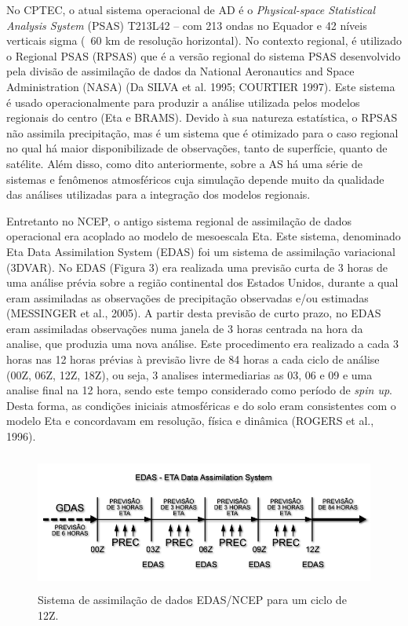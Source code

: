 No CPTEC, o atual sistema operacional de AD é o \textit{Physical-space Statistical Analysis System} (PSAS) T213L42 – com 213 ondas no Equador e 42 níveis verticais sigma (~60 km de resolução horizontal). No contexto regional, é utilizado o Regional PSAS (RPSAS) que é a versão regional do sistema PSAS desenvolvido pela divisão de assimilação de dados da National Aeronautics and Space Administration (NASA) (Da SILVA et al. 1995; COURTIER 1997). Este sistema é usado operacionalmente para produzir a análise utilizada pelos modelos regionais do centro (Eta e BRAMS). Devido à sua natureza estatística, o RPSAS não assimila precipitação, mas é um sistema que é otimizado para o caso regional no qual há maior disponibilizade de observações, tanto de superfície, quanto de satélite. Além disso, como dito anteriormente, sobre a AS há uma série de sistemas e fenômenos atmosféricos cuja simulação depende muito da qualidade das análises utilizadas para a integração dos modelos regionais.

Entretanto no NCEP, o antigo sistema regional de assimilação de dados operacional era acoplado ao modelo de mesoescala Eta. Este sistema, denominado Eta Data Assimilation System (EDAS) foi um sistema de assimilação variacional (3DVAR). No EDAS (Figura 3) era realizada uma previsão curta de 3 horas de uma análise prévia sobre a região continental dos Estados Unidos, durante a qual eram assimiladas as observações de precipitação observadas e/ou estimadas (MESSINGER et al., 2005). A partir desta previsão de curto prazo, no EDAS eram assimiladas observações numa janela de 3 horas centrada na hora da analise, que produzia uma nova análise. Este procedimento era realizado a cada 3 horas nas 12 horas prévias à previsão livre de 84 horas a cada ciclo de análise (00Z, 06Z, 12Z, 18Z), ou seja, 3 analises intermediarias as 03, 06 e 09 e uma analise final na 12 hora, sendo este tempo considerado como período de \textit{spin up}. Desta forma, as condições iniciais atmosféricas e do solo eram consistentes com o modelo Eta e concordavam em resolução, física e dinâmica (ROGERS et al., 1996).

\begin{figure}[!hbp]
\centering
\includegraphics[height=4.5cm]{./figs/EDAS.png}
\caption{Sistema de assimilação de dados EDAS/NCEP para um ciclo de 12Z.}
\label{fig03}
\end{figure}

